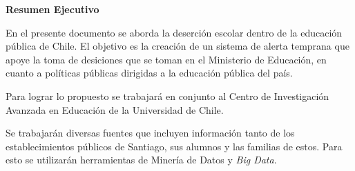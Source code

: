     \begin{center}
        \vspace*{1cm}
        
        \textbf{Resumen Ejecutivo}
        
        \vspace{0.5cm}
        
    \end{center}


En el presente documento se aborda la deserción escolar dentro de la educación pública de Chile. El objetivo es la creación de un sistema de alerta temprana que apoye la toma de desiciones que se toman en el Ministerio de Educación, en cuanto a políticas públicas dirigidas a la educación pública del país. 

Para lograr lo propuesto se trabajará en conjunto al Centro de Investigación Avanzada en Educación de la Universidad de Chile. 

Se trabajarán diversas fuentes que incluyen información tanto de los establecimientos públicos de Santiago, sus alumnos y las familias de estos. Para esto se utilizarán herramientas de Minería de Datos y \textit{Big Data}.